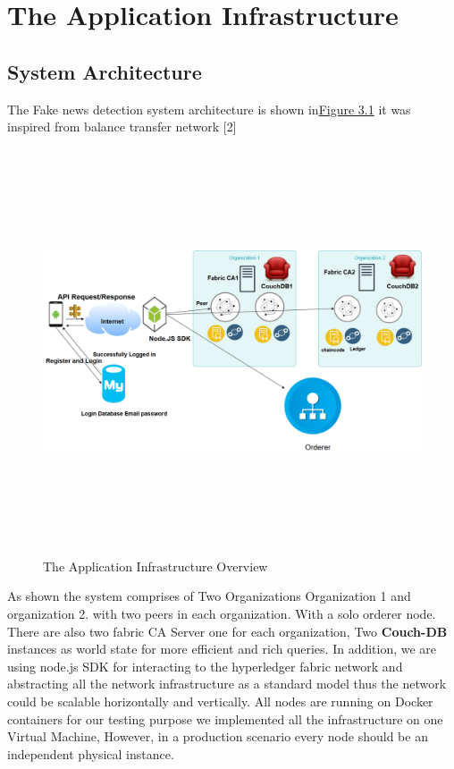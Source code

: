 \chapter{The Application Infrastructure}

\section{System Architecture}

The Fake news detection system architecture is shown in\hyperref[fig:infrastructure]{Figure 3.1} it was inspired from balance transfer network [2]
 \begin{figure}[H]
\includegraphics[width=15cm,height=12cm]{images/infrastructure.png}
\caption{The Application Infrastructure Overview}
\label{fig:infrastructure}
\end{figure}
\cleardoublepage

As shown the system comprises of Two Organizations Organization 1 and organization 2. with two peers in each organization. 
With a solo orderer node.  There are also two fabric CA Server one for each organization, Two \textbf{Couch-DB} instances as world state for more efficient and rich queries. 
In addition, we are using node.js SDK  for interacting to the hyperledger fabric network and abstracting all the network infrastructure as a standard model thus the network could be scalable horizontally and vertically. All nodes are running on Docker containers for our testing purpose we implemented all the infrastructure on one Virtual Machine, However, in a production scenario every node should be an independent physical instance. \\ 

